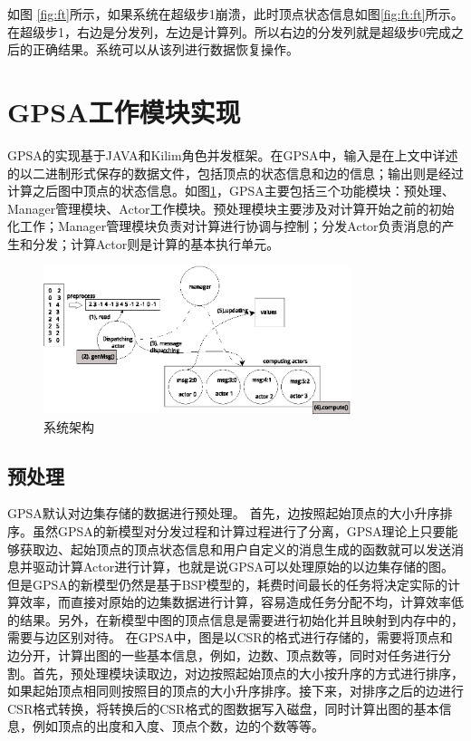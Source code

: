 如图 \ref{fig:ft}所示，如果系统在超级步1崩溃，此时顶点状态信息如图\ref{fig:ft:ft}所示。在超级步1，右边是分发列，左边是计算列。所以右边的分发列就是超级步0完成之后的正确结果。系统可以从该列进行数据恢复操作。



\section{GPSA工作模块实现}

GPSA的实现基于JAVA和Kilim角色并发框架。在GPSA中，输入是在上文中详述的以二进制形式保存的数据文件，包括顶点的状态信息和边的信息；输出则是经过计算之后图中顶点的状态信息。如图\ref{fig:overview}，GPSA主要包括三个功能模块：预处理、Manager管理模块、Actor工作模块。预处理模块主要涉及对计算开始之前的初始化工作；Manager管理模块负责对计算进行协调与控制；分发Actor负责消息的产生和分发；计算Actor则是计算的基本执行单元。

\begin{figure}[htbp]
\centering
\includegraphics[width=0.8\textwidth]{myfigures/newexample.eps}
\caption{系统架构}\label{fig:overview}
\vspace{\baselineskip}
\end{figure}

\subsection{预处理}
GPSA默认对边集存储的数据进行预处理。
首先，边按照起始顶点的大小升序排序。虽然GPSA的新模型对分发过程和计算过程进行了分离，GPSA理论上只要能够获取边、起始顶点的顶点状态信息和用户自定义的消息生成的函数就可以发送消息并驱动计算Actor进行计算，也就是说GPSA可以处理原始的以边集存储的图。但是GPSA的新模型仍然是基于BSP模型的，耗费时间最长的任务将决定实际的计算效率，而直接对原始的边集数据进行计算，容易造成任务分配不均，计算效率低的结果。另外，在新模型中图的顶点信息是需要进行初始化并且映射到内存中的，需要与边区别对待。
在GPSA中，图是以CSR的格式进行存储的，需要将顶点和边分开，计算出图的一些基本信息，例如，边数、顶点数等，同时对任务进行分割。首先，预处理模块读取边，对边按照起始顶点的大小按升序的方式进行排序，如果起始顶点相同则按照目的顶点的大小升序排序。接下来，对排序之后的边进行CSR格式转换，将转换后的CSR格式的图数据写入磁盘，同时计算出图的基本信息，例如顶点的出度和入度、顶点个数，边的个数等等。

